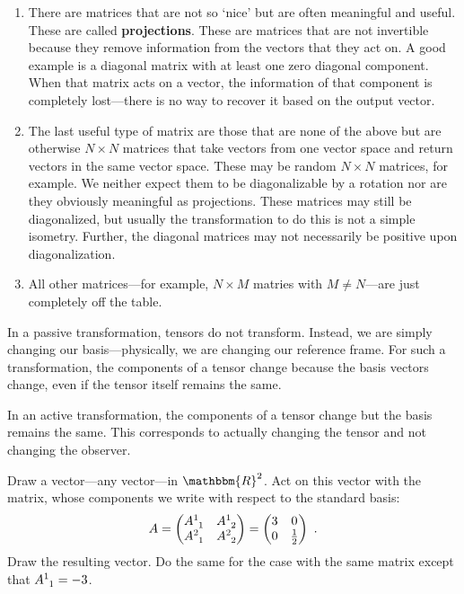 \documentclass[12pt, oneside]{report}    %
\begin{document}
\begin{enumerate}
    \item There are matrices that are not so `nice' but are often meaningful and useful. These are called \textbf{projections}. These are matrices that are not invertible because they remove information from the vectors that they act on. A good example is a diagonal matrix with at least one zero diagonal component. When that matrix acts on a vector, the information of that component is completely lost---there is no way to recover it based on the output vector. 
    \item The last useful type of matrix are those that are none of the above but are otherwise $N\times N$ matrices that take vectors from one vector space and return vectors in the same vector space. These may be random $N\times N$ matrices, for example. We neither expect them to be diagonalizable by a rotation nor are they obviously meaningful as projections. These matrices may still be diagonalized, but usually the transformation to do this is not a simple isometry. Further, the diagonal matrices may not necessarily be positive upon diagonalization.
    \item All other matrices---for example, $N\times M$ matries with $M\neq N$---are just completely off the table. 
\end{enumerate}

\begin{example} In a passive transformation, tensors do not transform. Instead, we are simply changing our basis---physically, we are changing our reference frame. For such a transformation, the components of a tensor change because the basis vectors change, even if the tensor itself remains the same. 

In an active transformation, the components of a tensor change but the basis remains the same. This corresponds to actually changing the tensor and not changing the observer.
\end{example}

\begin{exercise}
Draw a vector---any vector---in $\mathbbm{R}^2$. Act on this vector with the matrix, whose components we write with respect to the standard basis:
\begin{align}
    A = \begin{pmatrix}
        A\aij{1}{1} & A\aij{1}{2}\\
        A\aij{2}{1} & A\aij{2}{2}
    \end{pmatrix}
    =
    \begin{pmatrix}
        3 & 0\\
        0 & \frac{1}{2}
    \end{pmatrix} \ .
\end{align}
Draw the resulting vector. Do the same for the case with the same matrix except that $A\aij{1}{1} = -3$.
\end{exercise}
\end{document}
